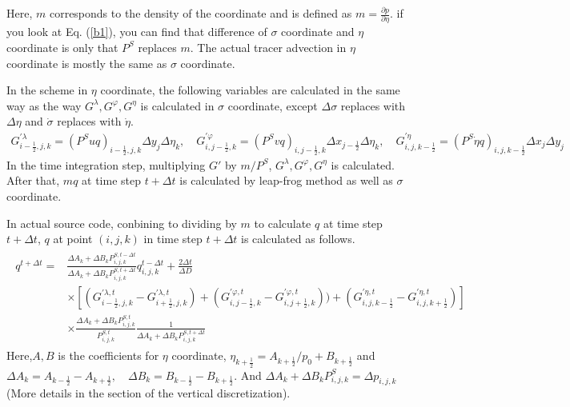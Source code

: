 Here, \(m\) corresponds to the density of the coordinate and is defined as \(m=\frac{\partial p}{\partial \eta}\). if you look at Eq. (\ref{b1}), you can find that difference of
\(\sigma\) coordinate and \(\eta\) coordinate is only that \(P^{S}\) replaces \(m\). The actual tracer advection in \(\eta\) coordinate is mostly the same as \(\sigma\) coordinate.

In the scheme in \(\eta\) coordinate, the following variables are calculated in the same way as the way \(G^{\lambda}, G^{\varphi}, G^{\eta}\) is calculated in \(\sigma\) coordinate, except
\(\Delta \sigma\) replaces with \(\Delta \eta\) and \(\dot{\sigma}\) replaces with \(\dot{\eta}\).
\begin{eqnarray}G^{\prime \lambda}_{i-\frac{1}{2},j,k}=(P^{S}uq)_{i-\frac{1}{2},j,k} \Delta y_{j} \Delta \eta_{k},\quad G^{\prime \varphi}_{i,j-\frac{1}{2},k}=(P^{S}vq)_{i,j-\frac{1}{2},k} \Delta x_{j-\frac{1}{2}} \Delta \eta_{k},\quad G^{\prime \eta}_{i,j,k-\frac{1}{2}}=(P^{S} \dot{\eta} q)_{i,j,k-\frac{1}{2}} \Delta x_{j} \Delta y_{j}\end{eqnarray}
In the time integration step, multiplying \(G\prime\) by \(m/P^{S}\), \(G^{\lambda}, G^{\varphi}, G^{\eta}\) is calculated. After that, \(mq\) at time step \(t+\Delta t\) is calculated by leap-frog
method as well as \(\sigma\) coordinate.

In actual source code, conbining to dividing by \(m\) to calculate \(q\) at time step \(t+\Delta t\), \(q\) at point \((i,j,k)\) in time step \(t+\Delta t\) is calculated as follows. \begin{eqnarray}\begin{split}
        q^{t+\Delta t}=&\frac{\Delta A_{k}+\Delta B_{k} P^{S,t-\Delta t}_{i,j,k}}{\Delta A_{k}+\Delta B_{k} P^{S,t+\Delta t}_{i,j,k}}q^{t-\Delta t}_{i,j,k}+\frac{2\Delta t}{\Delta D}\\
    &\times [(G^{\prime \lambda,t}_{i-\frac{1}{2},j,k}-G^{\prime \lambda,t}_{i+\frac{1}{2},j,k})+(G^{\prime \varphi,t}_{i,j-\frac{1}{2},k}-G^{\prime \varphi,t}_{i,j+\frac{1}{2},k}))+(G^{\prime \eta,t}_{i,j,k-\frac{1}{2}}-G^{\prime \eta,t}_{i,j,k+\frac{1}{2}})]\\
    &\times \frac{\Delta A_{k}+\Delta B_{k} P^{S,t}_{i,j,k}}{P^{S,t}_{i,j,k}}\frac{1}{\Delta A_{k}+\Delta B_{k} P^{S,t+\Delta t}_{i,j,k}}
  \end{split}\end{eqnarray} Here,\(A,B\) is the coefficients for \(\eta\) coordinate, \(\eta_{k+\frac{1}{2}}=A_{k+\frac{1}{2}}/p_{0}+B_{k+\frac{1}{2}}\) and
\(\Delta A_{k}=A_{k-\frac{1}{2}}-A_{k+\frac{1}{2}},\quad \Delta B_{k}=B_{k-\frac{1}{2}}-B_{k+\frac{1}{2}}\). And \(\Delta A_{k}+\Delta B_{k} P^{S}_{i,j,k}=\Delta p_{i,j,k}\)(More details in the
section of the vertical discretization).

